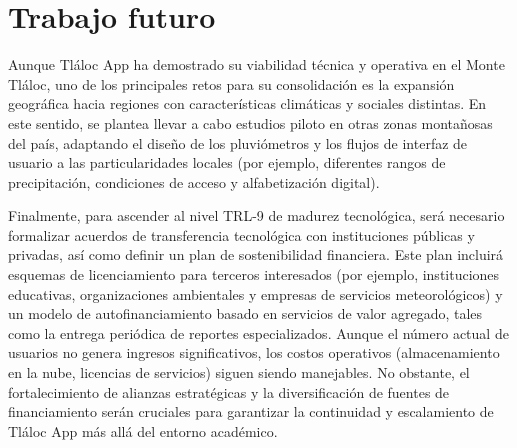\section{Trabajo futuro}

Aunque Tláloc App ha demostrado su viabilidad técnica y operativa en el Monte Tláloc, uno de los principales retos para su consolidación es la expansión geográfica hacia regiones con características climáticas y sociales distintas. En este sentido, se plantea llevar a cabo estudios piloto en otras zonas montañosas del país, adaptando el diseño de los pluviómetros y los flujos de interfaz de usuario a las particularidades locales (por ejemplo, diferentes rangos de precipitación, condiciones de acceso y alfabetización digital). 

Finalmente, para ascender al nivel TRL-9 de madurez tecnológica, será necesario formalizar acuerdos de transferencia tecnológica con instituciones públicas y privadas, así como definir un plan de sostenibilidad financiera. Este plan incluirá esquemas de licenciamiento para terceros interesados (por ejemplo, instituciones educativas, organizaciones ambientales y empresas de servicios meteorológicos) y un modelo de autofinanciamiento basado en servicios de valor agregado, tales como la entrega periódica de reportes especializados. Aunque el número actual de usuarios no genera ingresos significativos, los costos operativos (almacenamiento en la nube, licencias de servicios) siguen siendo manejables. No obstante, el fortalecimiento de alianzas estratégicas y la diversificación de fuentes de financiamiento serán cruciales para garantizar la continuidad y escalamiento de Tláloc App más allá del entorno académico.